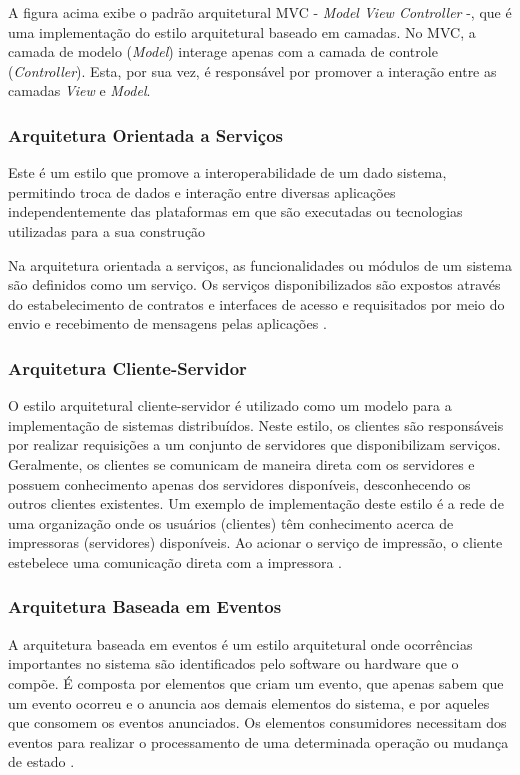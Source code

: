 A figura acima exibe o padrão arquitetural MVC - \textit{Model View Controller} -, que é uma implementação do estilo arquitetural baseado em camadas. No MVC, a camada de modelo (\textit{Model}) interage apenas com a camada de controle (\textit{Controller}). Esta, por sua vez, é responsável por promover a interação entre as camadas \textit{View} e \textit{Model}.

\subsubsection{Arquitetura Orientada a Serviços}

Este é um estilo que promove a interoperabilidade de um dado sistema, permitindo troca de dados e interação entre diversas aplicações independentemente das plataformas em que são executadas ou tecnologias utilizadas para a sua construção \cite{oqueesoa_2010}

Na arquitetura orientada a serviços, as funcionalidades ou módulos de um sistema são definidos como um serviço. Os serviços disponibilizados são expostos através do estabelecimento de contratos e interfaces de acesso e requisitados por meio do envio e recebimento de mensagens pelas aplicações \cite{oqueesoa_2010}.

\subsubsection{Arquitetura Cliente-Servidor}
O estilo arquitetural cliente-servidor é utilizado como um modelo para a implementação de sistemas distribuídos. Neste estilo, os clientes são responsáveis por realizar requisições a um conjunto de servidores que disponibilizam serviços. Geralmente, os clientes se comunicam de maneira direta com os servidores e possuem conhecimento apenas dos servidores disponíveis, desconhecendo os outros clientes existentes. Um exemplo de implementação deste estilo é a rede de uma organização onde os usuários (clientes) têm conhecimento acerca de impressoras (servidores) disponíveis. Ao acionar o serviço de impressão, o cliente estebelece uma comunicação direta com a impressora \cite{sommerville2008engenharia}.

\subsubsection{Arquitetura Baseada em Eventos}
A arquitetura baseada em eventos é um estilo arquitetural onde ocorrências importantes no sistema são identificados pelo software ou hardware que o compõe. É composta por elementos que criam um evento, que apenas sabem que um evento ocorreu e o anuncia aos demais elementos do sistema, e por aqueles que consomem os eventos anunciados. Os elementos consumidores necessitam dos eventos para realizar o processamento de uma determinada operação ou mudança de estado \cite{rouse}.


